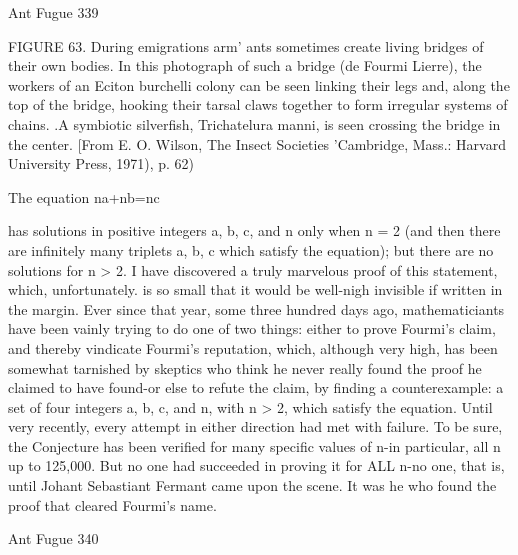 Ant Fugue                                                                               339

   FIGURE 63. During emigrations arm' ants sometimes create living bridges of their
   own bodies. In this photograph of such a bridge (de Fourmi Lierre), the workers of
   an Eciton burchelli colony can be seen linking their legs and, along the top of the
   bridge, hooking their tarsal claws together to form irregular systems of chains. .A
   symbiotic silverfish, Trichatelura manni, is seen crossing the bridge in the center.
   [From E. O. Wilson, The Insect Societies 'Cambridge, Mass.: Harvard University
   Press, 1971), p. 62)

   The equation
                                        na+nb=nc

   has solutions in positive integers a, b, c, and n only when n = 2 (and then there are
   infinitely many triplets a, b, c which satisfy the equation); but there are no solutions
   for n > 2. I have discovered a truly marvelous proof of this statement, which,
   unfortunately. is so small that it would be well-nigh invisible if written in the margin.
   Ever since that year, some three hundred days ago, mathematiciants have been vainly
   trying to do one of two things: either to prove Fourmi's claim, and thereby vindicate
   Fourmi's reputation, which, although very high, has been somewhat tarnished by
   skeptics who think he never really found the proof he claimed to have found-or else
   to refute the claim, by finding a counterexample: a set of four integers a, b, c, and n,
   with n > 2, which satisfy the equation. Until very recently, every attempt in either
   direction had met with failure. To be sure, the Conjecture has been verified for many
   specific values of n-in particular, all n up to 125,000. But no one had succeeded in
   proving it for ALL n-no one, that is, until Johant Sebastiant Fermant came upon the
   scene. It was he who found the proof that cleared Fourmi's name.



Ant Fugue                                                                               340


